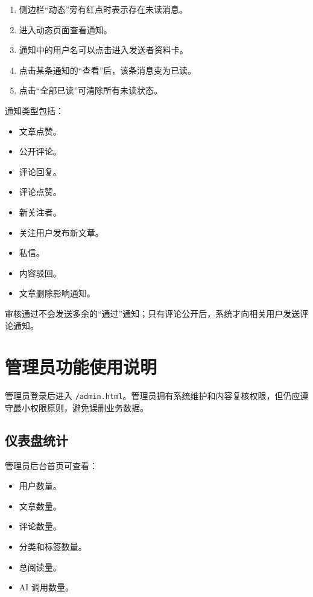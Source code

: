 \documentclass[UTF8,a4paper,12pt]{ctexart}
\newcommand{\code}[1]{\texttt{#1}}
\begin{document}
\begin{enumerate}
  \item 侧边栏“动态”旁有红点时表示存在未读消息。
  \item 进入动态页面查看通知。
  \item 通知中的用户名可以点击进入发送者资料卡。
  \item 点击某条通知的“查看”后，该条消息变为已读。
  \item 点击“全部已读”可清除所有未读状态。
\end{enumerate}

通知类型包括：

\begin{itemize}
  \item 文章点赞。
  \item 公开评论。
  \item 评论回复。
  \item 评论点赞。
  \item 新关注者。
  \item 关注用户发布新文章。
  \item 私信。
  \item 内容驳回。
  \item 文章删除影响通知。
\end{itemize}

审核通过不会发送多余的“通过”通知；只有评论公开后，系统才向相关用户发送评论通知。

\section{管理员功能使用说明}

管理员登录后进入 \code{/admin.html}。管理员拥有系统维护和内容复核权限，但仍应遵守最小权限原则，避免误删业务数据。

\subsection{仪表盘统计}

管理员后台首页可查看：

\begin{itemize}
  \item 用户数量。
  \item 文章数量。
  \item 评论数量。
  \item 分类和标签数量。
  \item 总阅读量。
  \item AI 调用数量。
\end{itemize}
\end{document}
